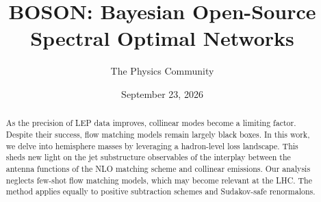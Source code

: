 \documentclass[11pt]{article}
\title{BOSON: Bayesian Open-Source Spectral Optimal Networks}
\author{The Physics Community}
\date{September 23, 2026}
\numberwithin{equation}{section}
\theoremstyle{definition}
\theoremstyle{remark}
\begin{document}
\maketitle
\begin{abstract}
As the precision of LEP data improves, collinear modes become a limiting
factor. Despite their success, flow matching models remain largely black
boxes. In this work, we delve into hemisphere masses by leveraging a
hadron-level loss landscape. This sheds new light on the jet
substructure observables of the interplay between the antenna functions
of the NLO matching scheme and collinear emissions. Our analysis
neglects few-shot flow matching models, which may become relevant at the
LHC. The method applies equally to positive subtraction schemes and
Sudakov-safe renormalons.
\end{abstract}
\tableofcontents



\nocite{*}


\end{document}
